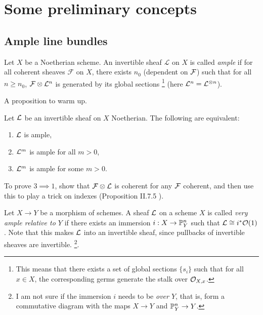 \chapter{Some preliminary concepts}

\section{Ample line bundles}

\begin{definition}
	Let $X$ be a Noetherian scheme. An invertible sheaf $\mathcal{L}$ on $X$ is called \emph{ample} if for all coherent sheaves $\mathcal{F}$ on $X$, there exists $n_0$ (dependent on $\mathcal{F}$) such that for all $n \geq n_0$, $\mathcal{F} \otimes \mathcal{L}^n$ is generated by its global sections \footnote{This means that there exists a set of global sections $\{s_i\}$ such that for all $x \in X$, the corresponding germs generate the stalk over $\mathcal{O}_{X,x}$.} (here $\mathcal{L}^n = \mathcal{L}^{\otimes n}$).
\end{definition}

A proposition to warm up.
\begin{proposition} Let $\mathcal{L}$ be an invertible sheaf on $X$ Noetherian.
	The following are equivalent: \begin{enumerate}
    	\item $\mathcal{L}$ is ample,
		\item $\mathcal{L}^m$ is ample for all $m > 0$,
		\item $\mathcal{L}^m$ is ample for some $m > 0$.
    \end{enumerate}
\end{proposition}

To prove $3 \implies 1$, show that $\mathcal{F} \otimes \mathcal{L}$ is coherent for any $\mathcal{F}$ coherent, and then use this to play a trick on indexes (Proposition II.7.5 \cite{hartshorne2013algebraic}).

\begin{definition}
	Let $X \to Y$ be a morphism of schemes. A sheaf $\mathcal{L}$ on a scheme $X$ is called \emph{very ample relative to $Y$} if there exists an immersion $i: X \to \mathbb{P}^n_Y$ such that $\mathcal{L} \cong i^* \mathcal{O}(1)$. Note that this makes $\mathcal{L}$ into an invertible sheaf, since pullbacks of invertible sheaves are invertible. \footnote{I am not sure if the immersion $i$ needs to be \emph{over $Y$}, that is, form a commutative diagram with the maps $X \to Y$ and $\mathbb{P}^n_Y \to Y$.}. 
\end{definition}

